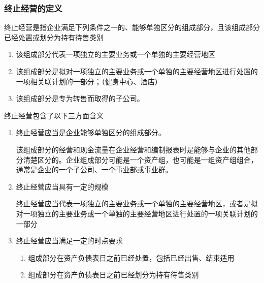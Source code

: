 \documentclass[UTF8,12pt]{ctexart}
\numberwithin{equation}{section} %
\numberwithin{figure}{section}
\numberwithin{table}{section}
\begin{document}
	\subsubsection{终止经营的定义}
	终止经营是指企业满足下列条件之一的、能够单独区分的组成部分，且该组成部分已经处置或划分为持有待售类别
	\begin{enumerate}
		\item 该组成部分代表一项独立的主要业务或一个单独的主要经营地区
		
		\item 该组成部分是拟对一项独立的主要业务或一个单独的主要经营地区进行处置的一项相关联计划的一部分；（健身中心、酒店）
		
		\item 该组成部分是专为转售而取得的子公司。
	\end{enumerate}
	
	终止经营包含了以下三方面含义
	\begin{enumerate}
		\item 终止经营应当是企业能够单独区分的组成部分。
		
		该组成部分的经营和现金流量在企业经营和编制报表时是能够与企业的其他部分清楚区分的。企业组成部分可能是一个资产组，也可能是一组资产组组合，通常是企业的一个子公司、一个事业部或事业群。
		
		\item 终止经营应当具有一定的规模
		
		终止经营应当代表一项独立的主要业务或一个单独的主要经营地区，或者是拟对一项独立的主要业务或一个单独的主要经营地区进行处置的一项关联计划的一部分
		
		\item 终止经营应当满足一定的时点要求
		\begin{enumerate}
			\item 组成部分在资产负债表日之前已经处置，包括已经出售、结束适用
			
			\item 组成部分在资产负债表日之前已经划分为持有待售类别
		\end{enumerate}
	\end{enumerate}
\end{document}
